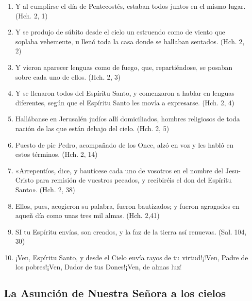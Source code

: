 \documentclass[a4paper,11pt]{article}
\begin{document}
      \begin{enumerate}
        \item Y al cumplirse el día de Pentecostés, estaban todos juntos en el mismo lugar. (Hch. 2, 1)

        \item Y se produjo de súbito desde el cielo un estruendo como de viento que soplaba vehemente, u llenó toda la casa
        donde se hallaban sentados. (Hch. 2, 2)

        \item Y vieron aparecer lenguas como de fuego, que, repartiéndose, se posaban sobre cada uno de ellos. (Hch. 2, 3)

        \item Y se llenaron todos del Espíritu Santo, y comenzaron a hablar en lenguas diferentes, según que el Espíritu Santo les movía
        a expresarse. (Hch. 2, 4)

        \item Hallábanse en Jerusalén judíos allí domiciliados, hombres religiosos de toda nación de las que están debajo del cielo. (Hch. 2, 5)

        \item Puesto de pie Pedro, acompañado de los Once, alzó en voz y les habló en estos términos. (Hch. 2, 14)

        \item «Arrepentíos, dice, y bautícese cada uno de vosotros en el nombre del Jesu-Cristo para remisión de vuestros pecados, y recibiréis el don
        del Espíritu Santo». (Hch. 2, 38)

        \item Ellos, pues, acogieron su palabra, fueron bautizados; y fueron agragados en aqueñ día como unas tres mil almas. (Hch. 2,41)

        \item SI tu Espíritu envías, son creados, y la faz de la tierra así renuevas. (Sal. 104, 30)

        \item ¡Ven, Espíritu Santo, y desde el Cielo envía rayos de tu virtud!¡!Ven, Padre de los pobres!¡Ven, Dador de tus Dones!¡Ven, de almas luz!
        
      \end{enumerate}

    \subsection*{\hfil La Asunción de Nuestra Señora a los cielos \hfil}
\end{document}
